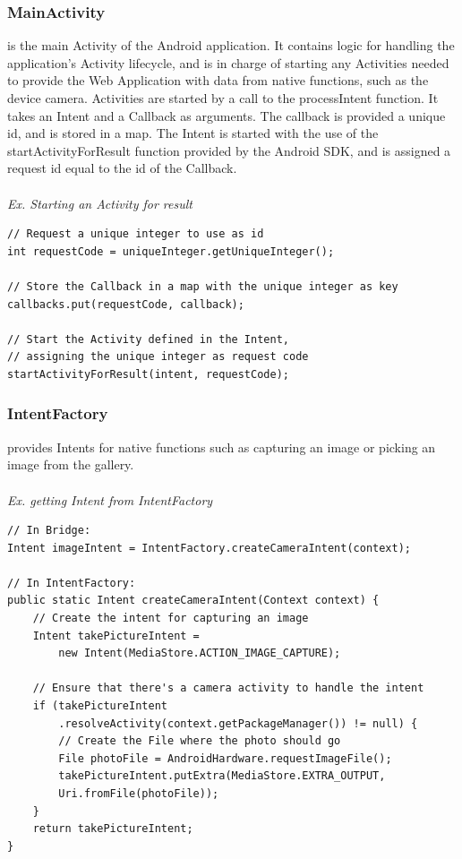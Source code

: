 \subsubsection{MainActivity} is the main Activity of the Android application. It contains logic for handling the application's Activity lifecycle, and is in charge of starting any Activities needed to provide the Web Application with data from native functions, such as the device camera. Activities are started by a call to the processIntent function. It takes an Intent and a Callback as arguments. The callback is provided a unique id, and is stored in a map. The Intent is started with the use of the startActivityForResult function provided by the Android SDK, and is assigned a request id equal to the id of the Callback. 
\\\\
	
\emph{Ex. Starting an Activity for result}
\begin{lstlisting}
// Request a unique integer to use as id
int requestCode = uniqueInteger.getUniqueInteger();

// Store the Callback in a map with the unique integer as key	
callbacks.put(requestCode, callback);
   
// Start the Activity defined in the Intent, 
// assigning the unique integer as request code
startActivityForResult(intent, requestCode);
\end{lstlisting}
	
\subsubsection{IntentFactory} provides Intents for native functions such as capturing an image or picking an image from the gallery.
	\\\\
	\emph{Ex. getting Intent from IntentFactory}
	
	\begin{lstlisting}
// In Bridge:
Intent imageIntent = IntentFactory.createCameraIntent(context);
		
// In IntentFactory:
public static Intent createCameraIntent(Context context) {
	// Create the intent for capturing an image
	Intent takePictureIntent = 
		new Intent(MediaStore.ACTION_IMAGE_CAPTURE);
	
	// Ensure that there's a camera activity to handle the intent
	if (takePictureIntent
		.resolveActivity(context.getPackageManager()) != null) {
		// Create the File where the photo should go
		File photoFile = AndroidHardware.requestImageFile();
		takePictureIntent.putExtra(MediaStore.EXTRA_OUTPUT,
		Uri.fromFile(photoFile));
	}
	return takePictureIntent;
}
\end{lstlisting}
	
